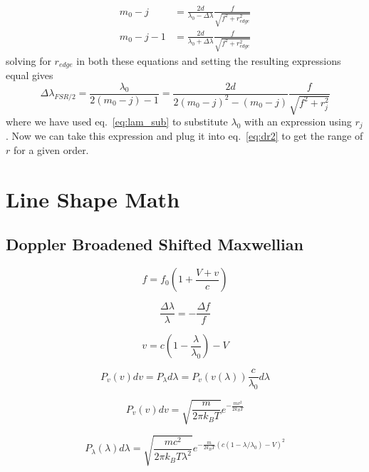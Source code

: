 \documentclass{article}
\begin{document}
\begin{align}
m_{0}-j&=\frac{2d}{\lambda_{0}-\Delta\lambda}\frac{f}{\sqrt{f^{2}+r_{edge}^{2}}}\\
m_{0}-j-1&=\frac{2d}{\lambda_{0}+\Delta\lambda}\frac{f}{\sqrt{f^{2}+r_{edge}^{2}}}
\end{align}
solving for $r_{edge}$ in both these equations and setting the resulting expressions equal gives
\begin{equation}
\Delta\lambda_{FSR/2}=\frac{\lambda_{0}}{2(m_{0}-j)-1}=\frac{2d}{2(m_{0}-j)^{2}-(m_{0}-j)}\frac{f}{\sqrt{f^{2}+r_{j}^{2}}}
\end{equation}
where we have used eq.~\ref{eq:lam_sub} to substitute $\lambda_{0}$ with an expression using $r_{j}$. Now we can take this expression and plug it into eq.~\ref{eq:dr2} to get the range of $r$ for a given order. 




\section{Line Shape Math}

\subsection{Doppler Broadened Shifted Maxwellian}

\begin{equation}
f = f_0 ( 1 + \frac{V+v}{c} )
\end{equation}

\begin{equation}
\frac{\Delta \lambda}{\lambda} = - \frac{\Delta f}{f}
\end{equation}

\begin{equation}
v = c (1 - \frac{\lambda}{\lambda_0}) - V
\end{equation}

\begin{equation}
P_v(v) dv = P_{\lambda} d \lambda = P_v ( v(\lambda) ) \frac{c}{\lambda_0} d\lambda
\end{equation}

\begin{equation}
P_v(v) dv = \sqrt{\frac{m}{2 \pi k_B T}} e^{- \frac{m v^2}{2 k_B T}}
\end{equation}

\begin{equation}
P_{\lambda}(\lambda) d \lambda = \sqrt{\frac{m c^2}{2 \pi k_B T \lambda^2}} e^{-\frac{m}{2 k_B T} \left(c(1-\lambda / \lambda_0 ) - V \right)^2}
\end{equation}
\end{document}
